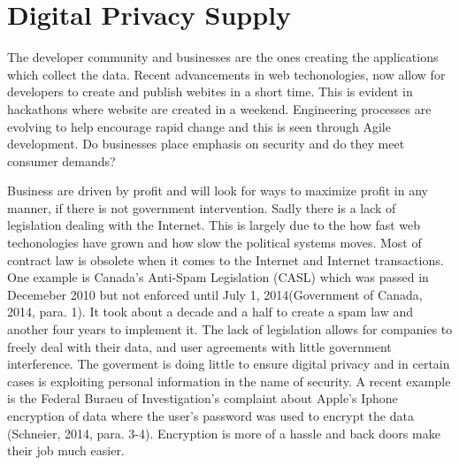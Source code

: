 \documentclass[12pt]{article}
\begin{document}
\section{Digital Privacy Supply}\label{sec:supply}

The developer community and businesses are the ones creating the applications which collect the data. Recent advancements in web techonologies, now allow for developers to create and publish webites in a short time. This is evident in hackathons where website are created in a weekend. Engineering processes are evolving to help encourage rapid change and this is seen through Agile development. Do businesses place emphasis on security and do they meet consumer demands?

Business are driven by profit and will look for ways to maximize profit in any manner, if there is not government intervention. Sadly there is a lack of legislation dealing with the Internet. This is largely due to the how fast web techonologies have grown and how slow the political systems moves. Most of contract law is obsolete when it comes to the Internet and Internet transactions. One example is Canada's Anti-Spam Legislation (CASL) which was passed in Decemeber 2010 but not enforced until July 1, 2014(Government of Canada, 2014, para. 1). It took about a decade and a half to create a spam law and another four years to implement it. The lack of legislation allows for companies to freely deal with their data, and user agreements with little government interference. The goverment is doing little to ensure digital privacy and in certain cases is exploiting personal information in the name of security. A recent example is the Federal Buraeu of Investigation's complaint about Apple's Iphone encryption of data where the user's password was used to encrypt the data (Schneier, 2014, para. 3-4). Encryption is more of a hassle and back doors make their job much easier.
\end{document}
